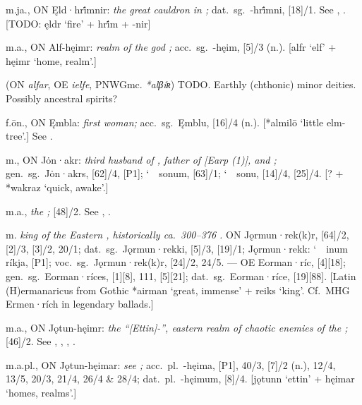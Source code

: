 \begin{itemize}
 m.ja., ON Ęld·hri̇́mnir:
  \emph{the great cauldron in ;} dat.~sg.~-hri̇́mni, [18]/1.  See , .
  [TODO: ęldr ‘fire’ + hri̇́m + -nir]

 m.a., ON Alf-hęimr:
  \emph{realm of the god ;} acc.~sg.~-hęim, [5]/3 (n.).
  [alfr ‘elf’ + hęimr ‘home, realm’.]

 (ON \emph{alfar}, OE \emph{ielfe}, PNWGmc. \emph{*alβíʀ})
  TODO.  Earthly (chthonic) minor deities.  Possibly ancestral spirits?

 f.ōn., ON Ęmbla:
  \emph{first woman;} acc.~sg.~Ęmblu, [16]/4 (n.).
  [*almilō ‘little elm-tree’.]
  See .

 m., ON Jȯn·akr:
  \emph{third husband of , father of [Earp (1)],  and ;} gen.~sg.~Jȯn·akrs, [62]/4, [P1]; \char`~\ sonum, [63]/1; \char`~\ sonu, [14]/4, [25]/4.
  [? + *wakraz ‘quick, awake’.]

 m.a.,
  \emph{the ;} [48]/2.
  See , .

 m.
  \emph{king of the Eastern , historically ca.~300--376 \ce.}
  ON Jǫrmun·rek(k)r, [64]/2, [2]/3, [3]/2, 20/1;
  dat.~sg.~Jǫrmun·rekki, [5]/3, [19]/1; Jǫrmun·rekk: \char`~\ inum ríkja, [P1];
  voc.~sg.~Jǫrmun·rek(k)r, [24]/2, 24/5.
  --- OE Eorman·ríc, [4][18]; gen.~sg.~Eorman·ríces, [1][8], 111, [5][21]; dat.~sg.~Eorman·ríce, [19][88].
  [Latin (H)ermanaricus from Gothic *airman ‘great, immense’ + reiks ‘king’.  Cf.~MHG Ermen·rích in legendary ballads.]

 m.a., ON Jǫtun-hęimr:
  \emph{the “[Ettin]-”, eastern realm of chaotic enemies of the ;} [46]/2.  See , , , .

 m.a.pl., ON Jǫtun-hęimar:
  \emph{see ;} acc.~pl.~-hęima, [P1], 40/3, [7]/2 (n.), 12/4, 13/5, 20/3, 21/4, 26/4 \& 28/4; dat.~pl.~-hęimum, [8]/4.
  [jǫtunn ‘ettin’ + hęimar ‘homes, realms’.]


\end{itemize}
